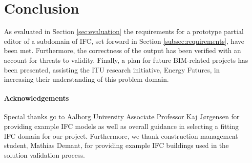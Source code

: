 \section{Conclusion}
\label{sec:conclusion}
As evaluated in Section \ref{sec:evaluation} the requirements for a prototype partial editor of a subdomain of IFC, set forward in Section \ref{subsec:requirements}, have been met. Furthermore, the correctness of the output has been verified with an account for threats to validity. Finally, a plan for future BIM-related projects has been presented, assisting the ITU research initiative, Energy Futures, in increasing their understanding of this problem domain.

\paragraph{Acknowledgements} Special thanks go to Aalborg University Associate Professor Kaj Jørgensen for providing example IFC models as well as overall guidance in selecting a fitting IFC domain for our project. Furthermore, we thank construction management student, Mathias Demant, for providing example IFC buildings used in the solution validation process.